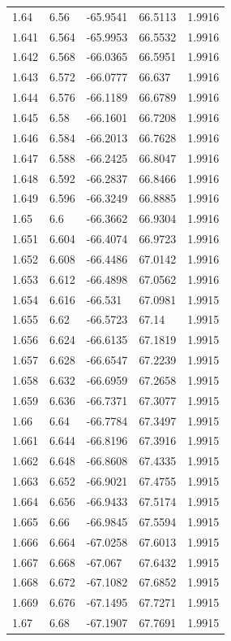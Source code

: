 \begin{tabular}{lllll}
1.64 & 6.56 & -65.9541 & 66.5113 & 1.9916 \\
1.641 & 6.564 & -65.9953 & 66.5532 & 1.9916 \\
1.642 & 6.568 & -66.0365 & 66.5951 & 1.9916 \\
1.643 & 6.572 & -66.0777 & 66.637 & 1.9916 \\
1.644 & 6.576 & -66.1189 & 66.6789 & 1.9916 \\
1.645 & 6.58 & -66.1601 & 66.7208 & 1.9916 \\
1.646 & 6.584 & -66.2013 & 66.7628 & 1.9916 \\
1.647 & 6.588 & -66.2425 & 66.8047 & 1.9916 \\
1.648 & 6.592 & -66.2837 & 66.8466 & 1.9916 \\
1.649 & 6.596 & -66.3249 & 66.8885 & 1.9916 \\
1.65 & 6.6 & -66.3662 & 66.9304 & 1.9916 \\
1.651 & 6.604 & -66.4074 & 66.9723 & 1.9916 \\
1.652 & 6.608 & -66.4486 & 67.0142 & 1.9916 \\
1.653 & 6.612 & -66.4898 & 67.0562 & 1.9916 \\
1.654 & 6.616 & -66.531 & 67.0981 & 1.9915 \\
1.655 & 6.62 & -66.5723 & 67.14 & 1.9915 \\
1.656 & 6.624 & -66.6135 & 67.1819 & 1.9915 \\
1.657 & 6.628 & -66.6547 & 67.2239 & 1.9915 \\
1.658 & 6.632 & -66.6959 & 67.2658 & 1.9915 \\
1.659 & 6.636 & -66.7371 & 67.3077 & 1.9915 \\
1.66 & 6.64 & -66.7784 & 67.3497 & 1.9915 \\
1.661 & 6.644 & -66.8196 & 67.3916 & 1.9915 \\
1.662 & 6.648 & -66.8608 & 67.4335 & 1.9915 \\
1.663 & 6.652 & -66.9021 & 67.4755 & 1.9915 \\
1.664 & 6.656 & -66.9433 & 67.5174 & 1.9915 \\
1.665 & 6.66 & -66.9845 & 67.5594 & 1.9915 \\
1.666 & 6.664 & -67.0258 & 67.6013 & 1.9915 \\
1.667 & 6.668 & -67.067 & 67.6432 & 1.9915 \\
1.668 & 6.672 & -67.1082 & 67.6852 & 1.9915 \\
1.669 & 6.676 & -67.1495 & 67.7271 & 1.9915 \\
1.67 & 6.68 & -67.1907 & 67.7691 & 1.9915 \\

\end{tabular}
